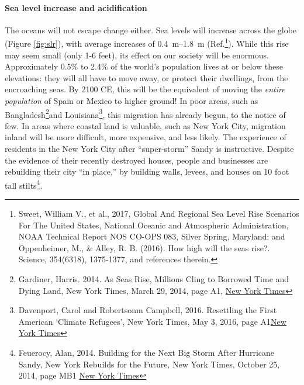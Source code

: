 \paragraph{Sea level increase and acidification}\label{sl_acid}
The oceans will not escape change either. Sea levels will increase across the globe (Figure \ref{fig:slr}), with average increases of \SIrange{0.4}{1.8}{\metre} (Ref.\footnote{Sweet, William V., et al., 2017, Global And Regional Sea Level Rise Scenarios For The United States, National Oceanic and Atmospheric Administration, NOAA Technical Report NOS CO-OPS 083, Silver Spring, Maryland; and Oppenheimer, M., \& Alley, R. B. (2016). How high will the seas rise?. Science, 354(6318), 1375-1377, and references therein.}). While this rise may seem small (only 1-6 feet), its effect on our society will be enormous. Approximately 0.5\% to 2.4\% of the world's population lives at or below these elevations: they will all have to move away, or protect their dwellings, from the encroaching seas. By 2100 CE, this will be the equivalent of moving the \emph{entire population} of Spain or Mexico to higher ground! In poor areas, such as Bangladesh\footnote{Gardiner, Harris. 2014. As Seas Rise, Millions Cling to Borrowed Time and Dying Land, New York Times, March 29, 2014, page A1, \href{https://www.nytimes.com/2014/03/29/world/asia/facing-rising-seas-bangladesh-confronts-the-consequences-of-climate-change.html}{New York Times}}and Louisiana\footnote{Davenport, Carol and Robertsonm Campbell, 2016. Resettling the First American `Climate Refugees', New York Times, May 3, 2016, page A1\href{https://www.nytimes.com/2016/05/03/us/resettling-the-first-american-climate-refugees.html}{New York Times}}, this migration has already begun, to the notice of few. In areas where coastal land is valuable, such as New York City, migration inland will be  more difficult, more expensive, and less likely. The experience of residents in the New York City after ``super-storm'' Sandy is instructive. Despite the evidence of their recently destroyed houses, people and businesses are rebuilding their city ``in place,'' by building walls, levees, and houses on 10 foot tall stilts\footnote{Feuerocy, Alan, 2014. Building for the Next Big Storm After Hurricane Sandy, New York Rebuilds for the Future, New York Times, October 25, 2014, page MB1 \href{https://www.nytimes.com/2014/10/26/nyregion/after-hurricane-sandy-new-york-rebuilds-for-the-future.html}{New York Times}}. \\


